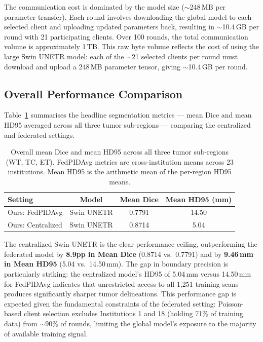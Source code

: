 \documentclass{article}
\begin{document}
The communication cost is dominated by the model size ($\sim$248\,MB per parameter transfer). Each round involves downloading the global model to each selected client and uploading updated parameters back, resulting in $\sim$10.4\,GB per round with 21 participating clients. Over 100 rounds, the total communication volume is approximately 1\,TB. This raw byte volume reflects the cost of using the large Swin UNETR model: each of the $\sim$21 selected clients per round must download and upload a 248\,MB parameter tensor, giving $\sim$10.4\,GB per round.

\subsection{Overall Performance Comparison}

Table~\ref{tab:overall_comparison} summarises the headline segmentation metrics --- mean Dice and mean HD95 averaged across all three tumor sub-regions --- comparing the centralized and federated settings.

\begin{table}[h]
\centering
\begin{tabular}{lccc}
\toprule
\textbf{Setting} & \textbf{Model} & \textbf{Mean Dice} & \textbf{Mean HD95 (mm)} \\
\midrule
Ours: FedPIDAvg   & Swin UNETR & 0.7791 & 14.50 \\
Ours: Centralized & Swin UNETR & 0.8714 &  5.04 \\
\bottomrule
\end{tabular}
\caption{Overall mean Dice and mean HD95 across all three tumor sub-regions (WT, TC, ET). FedPIDAvg metrics are cross-institution means across 23 institutions. Mean HD95 is the arithmetic mean of the per-region HD95 means.}
\label{tab:overall_comparison}
\end{table}

The centralized Swin UNETR is the clear performance ceiling, outperforming the federated model by \textbf{8.9pp in Mean Dice} (0.8714 vs.\ 0.7791) and by \textbf{9.46\,mm in Mean HD95} (5.04 vs.\ 14.50\,mm). The gap in boundary precision is particularly striking: the centralized model's HD95 of 5.04\,mm versus 14.50\,mm for FedPIDAvg indicates that unrestricted access to all 1,251 training scans produces significantly sharper tumor delineations. This performance gap is expected given the fundamental constraints of the federated setting: Poisson-based client selection excludes Institutions 1 and 18 (holding 71\% of training data) from $\sim$90\% of rounds, limiting the global model's exposure to the majority of available training signal.
\end{document}
